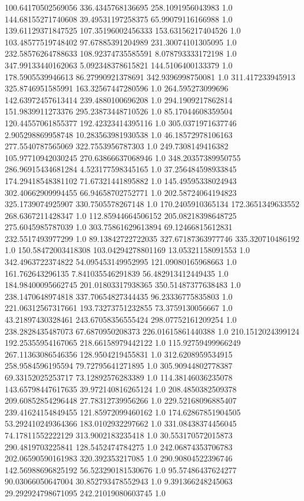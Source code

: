 100.64170502569056	336.4345768136695	258.1091956043983	1.0
144.68155271740608	39.49531197258375	65.99079116166988	1.0
139.61129371847525	107.35196002456333	153.63156217404526	1.0
103.48577519748402	97.67885391204989	231.30074101305095	1.0
232.58576264788633	108.92374735585591	8.078793333172198	1.0
347.99133440162063	5.092348378615821	144.5106400133379	1.0
178.5905539946613	86.27990921378691	342.9396998750081	1.0
311.417233945913	325.8746951585991	163.32567447280596	1.0
264.595273099696	142.63972457613414	239.4880100696208	1.0
294.1909217862814	151.9839911273376	295.23873448710526	1.0
85.17044608359504	120.44557061855377	192.42323414395116	1.0
305.0371971637746	2.905298869958748	10.283563981930538	1.0
46.18572978106163	277.5540787565069	322.7553956787303	1.0
249.7308149416382	105.97710942030245	270.63866637068946	1.0
348.20357389950755	286.96915434681284	4.523177598345165	1.0
37.256484598933845	174.29418548381102	71.67321441895882	1.0
145.49595338024943	302.40662909994455	66.94658702752771	1.0
202.58724064194823	325.1739074925907	330.7505578267148	1.0
170.2405910365134	172.3651349633552	268.6367211428347	1.0
112.85944664506152	205.08218398648725	275.6045985787039	1.0
303.75861629613894	69.12466815612831	232.5517493977299	1.0
89.13842722722035	327.67187363977746	335.320710486192	1.0
150.58472003418308	103.04294278801169	13.05321158091553	1.0
342.4963722374822	54.095453149952995	121.09080165968663	1.0
161.762643296135	7.841035546291839	56.482913412449435	1.0
184.98400095662745	201.01803317938365	350.51487377638483	1.0
238.1470648974818	337.70654827344435	96.23336775835803	1.0
221.06312567317661	193.73273751232855	73.3759130056667	1.0
43.21897430328461	243.67058356555424	298.07752161209254	1.0
238.2828435487073	67.6870950208373	226.01615861440388	1.0
210.1512024399124	192.25355954167065	218.66158979442122	1.0
115.92759499966249	267.11363086546356	128.9504219455831	1.0
312.6208959534915	258.9584596195594	79.72795641271895	1.0
305.90944802778387	69.33152025253717	73.12892576283389	1.0
114.38146036235078	143.65798447617635	39.972140816265124	1.0
208.4850382509378	209.60852854296448	27.78312739956266	1.0
229.52168096885407	239.41624154849455	121.85972099460162	1.0
174.62867851904505	53.292410249364366	183.0102932297662	1.0
331.08438374456045	74.17811552222129	313.9002183235418	1.0
30.553170572015873	290.4819703225841	128.5452474784275	1.0
242.06874353706783	202.06590590161983	320.392353217085	1.0
290.90804522396746	142.56988696825192	56.523290181530676	1.0
95.57486437624277	90.03066050647004	30.852793478552943	1.0
9.391366248245063	29.292924798671095	242.21019080603745	1.0
